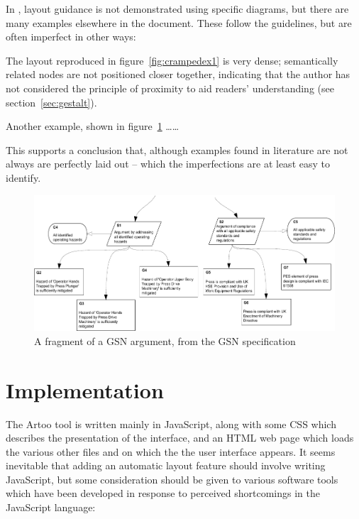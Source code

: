 In \cite{gsnstandard}, layout guidance is not demonstrated using specific diagrams, but there are many examples elsewhere in the document. These follow the guidelines, but are often imperfect in other ways:

\begin{itemize*}
    \item The layout reproduced in figure~\ref{fig:crampedex1} is very dense; semantically related nodes are not positioned closer together, indicating that the author has not considered the principle of proximity to aid readers' understanding (see section~\ref{sec:gestalt}).
    \item Another example, shown in figure~\ref{fig:unalignedsiblings} \ldots \ldots
\end{itemize*}

This supports a conclusion that, although examples found in literature are not always are perfectly laid out -- which  the imperfections are at least easy to identify.

\begin{figure}
    \includegraphics[width=\textwidth]{graphics/unaligned_siblings.pdf}
    \caption{A fragment of a GSN argument,
            from the GSN specification \citep[figure~42, section~2.3.6.5, pp.~34]{gsnstandard}}
    \label{fig:unalignedsiblings}
\end{figure}



\section{Implementation}

The Artoo tool is written mainly in JavaScript, along with some CSS which describes the presentation of the interface, and an HTML web page which loads the various other files and on which the the user interface appears. It seems inevitable that adding an automatic layout feature should involve writing JavaScript, but some consideration should be given to various software tools which have been developed in response to perceived shortcomings in the JavaScript language:

